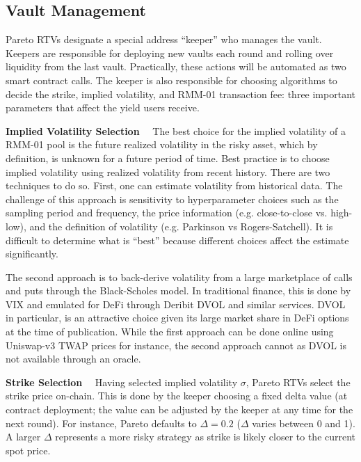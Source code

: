 \documentclass[hidelinks, 12pt]{article}
\begin{document}
\subsection{Vault Management}
\label{sec:management}

Pareto RTVs designate a special address ``keeper'' who manages the vault. Keepers are responsible for deploying new vaults each round and rolling over liquidity from the last vault. Practically, these actions will be automated as two smart contract calls.
The keeper is also responsible for choosing algorithms to decide the strike, implied volatility, and RMM-01 transaction fee: three important parameters that affect the yield users receive. 

\textbf{Implied Volatility Selection}$\quad$ The best choice for the implied volatility of a RMM-01 pool is the future realized volatility in the risky asset, which by definition, is unknown for a future period of time. 
Best practice is to choose implied volatility using realized volatility from recent history.
There are two techniques to do so. First, one can estimate volatility from historical data. The challenge of this approach is sensitivity to hyperparameter choices such as the sampling period and frequency, the price information (e.g. close-to-close vs. high-low), and the definition of volatility (e.g. Parkinson vs Rogers-Satchell). 
It is difficult to determine what is ``best'' because different choices affect the estimate significantly. 


The second approach is to back-derive volatility from a large marketplace of calls and puts through the Black-Scholes model. 
In traditional finance, this is done by VIX and emulated for DeFi through Deribit DVOL and similar services.
DVOL in particular, is an attractive choice given its large market share in DeFi options at the time of publication.
While the first approach can be done online using Uniswap-v3 TWAP prices for instance, the second approach cannot as DVOL is not available through an oracle. 

\textbf{Strike Selection}$\quad$ Having selected implied volatility $\sigma$, Pareto RTVs select the strike price on-chain. 
This is done by the keeper choosing a fixed delta value (at contract deployment; the value can be adjusted by the keeper at any time for the next round). For instance, Pareto defaults to $\Delta = 0.2$ ($\Delta$ varies between 0 and 1). 
A larger $\Delta$  represents a more risky strategy as strike is likely closer to the current spot price. 
\end{document}
